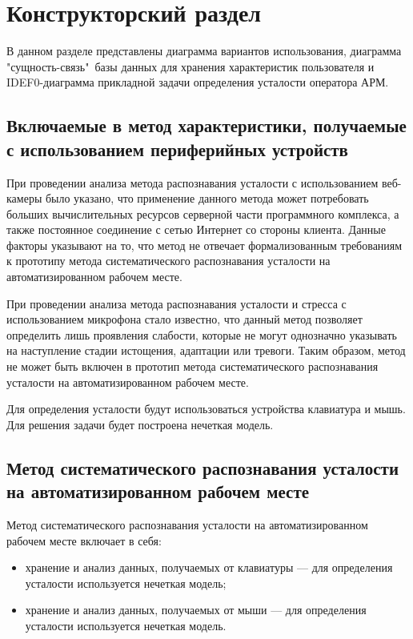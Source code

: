 \section{Конструкторский раздел}
В данном разделе представлены диаграмма вариантов использования, диаграмма "сущность-связь"\ базы данных для хранения характеристик пользователя и IDEF0-диаграмма прикладной задачи определения усталости оператора АРМ.

\subsection{Включаемые в метод характеристики, получаемые с использованием периферийных устройств}

При проведении анализа метода распознавания усталости с использованием веб-камеры было указано, что применение данного метода может потребовать больших вычислительных ресурсов серверной части программного комплекса, а также постоянное соединение с сетью Интернет со стороны клиента. Данные факторы указывают на то, что метод не отвечает формализованным требованиям к прототипу метода систематического распознавания усталости на автоматизированном рабочем месте.

При проведении анализа метода распознавания усталости и стресса с использованием микрофона стало известно, что данный метод позволяет определить лишь проявления слабости, которые не могут однозначно указывать на наступление стадии истощения, адаптации или тревоги. Таким образом, метод не может быть включен в прототип метода систематического распознавания усталости на автоматизированном рабочем месте.

Для определения усталости будут использоваться устройства клавиатура и мышь. Для решения задачи будет построена нечеткая модель.

\subsection{Метод систематического распознавания усталости на автоматизированном рабочем месте}
Метод систематического распознавания усталости на автоматизированном рабочем месте включает в себя:
\begin{itemize}[leftmargin=1.6\parindent]
\item хранение и анализ данных, получаемых от клавиатуры --- для определения усталости используется нечеткая модель;
\item хранение и анализ данных, получаемых от мыши --- для определения усталости используется нечеткая модель.
\end{itemize}

